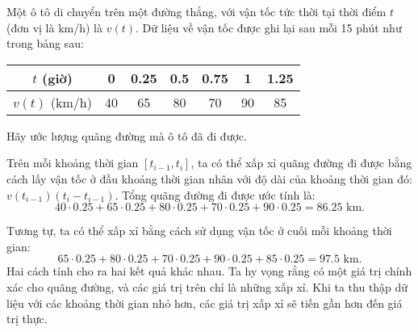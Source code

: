 \begin{example}
    Một ô tô di chuyển trên một đường thẳng, với vận tốc tức thời tại thời điểm $t$ (đơn vị là km/h) là $v(t)$. Dữ liệu về vận tốc được ghi lại sau mỗi 15 phút như trong bảng sau:
    \begin{center}
    \begin{tabular}{|c|c|c|c|c|c|c|}
        \hline
        $t$ (giờ) & 0 & 0.25 & 0.5 & 0.75 & 1 & 1.25 \\
        \hline
        $v(t)$ (km/h) & 40 & 65 & 80 & 70 & 90 & 85 \\
        \hline
    \end{tabular}
    \end{center}
    Hãy ước lượng quãng đường mà ô tô đã đi được.

    Trên mỗi khoảng thời gian $[t_{i-1}, t_i]$, ta có thể xấp xỉ quãng đường đi được bằng cách lấy vận tốc ở đầu khoảng thời gian nhân với độ dài của khoảng thời gian đó: $v(t_{i-1})(t_i - t_{i-1})$. Tổng quãng đường đi được ước tính là:
    \[ 40 \cdot 0.25 + 65 \cdot 0.25 + 80 \cdot 0.25 + 70 \cdot 0.25 + 90 \cdot 0.25 = 86.25 \text{ km}. \]
    
    Tương tự, ta có thể xấp xỉ bằng cách sử dụng vận tốc ở cuối mỗi khoảng thời gian:
    \[ 65 \cdot 0.25 + 80 \cdot 0.25 + 70 \cdot 0.25 + 90 \cdot 0.25 + 85 \cdot 0.25 = 97.5 \text{ km}. \]
    Hai cách tính cho ra hai kết quả khác nhau. Ta hy vọng rằng có một giá trị chính xác cho quãng đường, và các giá trị trên chỉ là những xấp xỉ. Khi ta thu thập dữ liệu với các khoảng thời gian nhỏ hơn, các giá trị xấp xỉ sẽ tiến gần hơn đến giá trị thực.
\end{example}

